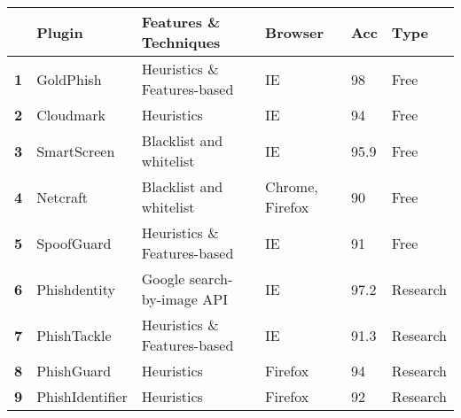 \begin{center}
	\begin{tabular}{  m{0.5em}  m{6em}  m{13.3em}  m{8.5em}  m{2.3em}  m{4.3em}  } \toprule

		                                & \textbf{Plugin }      & \textbf{Features \& Techniques}      & \textbf{Browser}    & \textbf{Acc}   & \textbf{Type}     \\ \midrule

		\multicolumn{1}{r}{\textbf{1}}  & GoldPhish             & Heuristics \& Features-based         & IE                  & 98             & Free              \\

		\multicolumn{1}{r}{\textbf{2}}  & Cloudmark             & Heuristics                           & IE                  & 94             & Free              \\

		\multicolumn{1}{r}{\textbf{3}}  & SmartScreen           & Blacklist and whitelist              & IE                  & 95.9           & Free              \\

		\multicolumn{1}{r}{\textbf{4}}  & Netcraft              & Blacklist and whitelist              & Chrome, Firefox     & 90             & Free              \\

		\multicolumn{1}{r}{\textbf{5}}  & SpoofGuard            & Heuristics \& Features-based         & IE                  & 91             & Free              \\

		\multicolumn{1}{r}{\textbf{6}}  & Phishdentity          & Google search-by-image API           & IE                  & 97.2           & Research          \\

		\multicolumn{1}{r}{\textbf{7}}  & PhishTackle           & Heuristics \& Features-based         & IE                  & 91.3           & Research          \\

		\multicolumn{1}{r}{\textbf{8}}  & PhishGuard            & Heuristics                           & Firefox             & 94             & Research          \\

		\multicolumn{1}{r}{\textbf{9}}  & PhishIdentifier       & Heuristics                           & Firefox             & 92             & Research          \\


\end{tabular}
\end{center}
